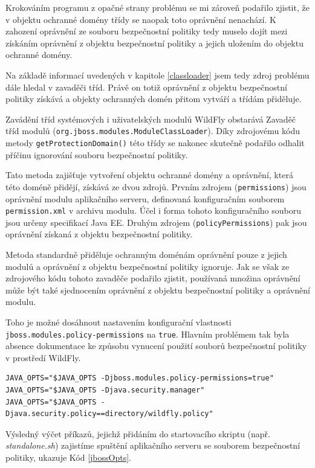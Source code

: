 Krokováním programu z opačné strany problému se mi zároveň podařilo zjistit, že v objektu ochranné domény třídy se naopak toto oprávnění nenachází. K zahození oprávnění ze souboru bezpečnostní politiky tedy muselo dojít mezi získáním oprávnění z objektu bezpečnostní politiky a jejich uložením do objektu ochranné domény.

Na základě informací uvedených v kapitole \ref{classloader} jsem tedy zdroj problému dále hledal v zavaděči tříd. Právě on totiž oprávnění z objektu bezpečnostní politiky získává a objekty ochranných domén přitom vytváří a třídám přiděluje.

Zavádění tříd systémových i uživatelských modulů WildFly obstarává Zavaděč tříd modulů ({\tt org.jboss.modules.ModuleClassLoader}). Díky zdrojovému kódu metody {\tt getProtectionDomain()} této třídy se nakonec skutečně podařilo odhalit příčinu ignorování souboru bezpečnostní politiky.

Tato metoda zajišťuje vytvoření objektu ochranné domény a oprávnění, která této doméně přidějí, získává ze dvou zdrojů. Prvním zdrojem ({\tt permissions}) jsou oprávnění modulu aplikačního serveru, definovaná konfiguračním souborem {\tt permission.xml} v archivu modulu. Účel i forma tohoto konfiguračního souboru jsou určeny specifikací Java EE. \cite{javaEEspec} Druhým zdrojem ({\tt policyPermissions}) pak jsou oprávnění získaná z objektu bezpečnostní politiky.

Metoda standardně přiděluje ochranným doménám oprávnění pouze z jejich modulů a oprávnění z objektu bezpečnostní politiky ignoruje. Jak se však ze zdrojového kódu tohoto zavaděče podařilo zjistit, používaná množina oprávnění může být také sjednocením oprávnění z objektu bezpečnostní politiky a oprávnění modulu.

Toho je možné dosáhnout nastavením konfigurační vlastnosti {\tt jboss.modules.policy-permissions} na {\tt true}. Hlavním problémem tak byla absence dokumentace ke způsobu vynucení použití souborů bezpečnostní politiky v prostředí WildFly.

\begin{lstlisting}[caption=Způsob nastavení spuštění aplikačního serveru se souborem bezpečnostní politiky, label=jbossOpts]
JAVA_OPTS="$JAVA_OPTS -Djboss.modules.policy-permissions=true"
JAVA_OPTS="$JAVA_OPTS -Djava.security.manager"
JAVA_OPTS="$JAVA_OPTS -Djava.security.policy==directory/wildfly.policy"
\end{lstlisting}

Výsledný výčet příkazů, jejichž přidáním do startovacího skriptu (např. {\it standalone.sh}) zajistíme spuštění aplikačního serveru se souborem bezpečnostní politiky, ukazuje Kód \ref{jbossOpts}.

